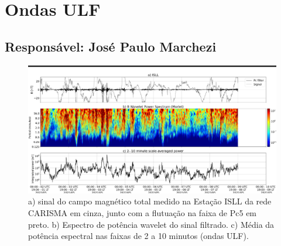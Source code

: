 \documentclass[a4paper, 10pt]{article}
\begin{document}
                     \section{Ondas ULF} 
 \subsection{Responsável: José Paulo Marchezi} 
 
\begin{figure}[H]
    
                            \centering
   
                                \includegraphics[width=14cm]{./figures//figureULF_0.png}

                                \caption{a) sinal do campo magnético total 
                              medido na Estação ISLL da rede CARISMA em cinza, 
                              junto com a flutuação na faixa de Pc5 em preto. b) 
                              Espectro de potência wavelet do sinal filtrado. c) 
                              Média da potência espectral nas faixas de 2 a 10 minutos 
                              (ondas ULF).}
                            \end{figure}
\end{document}
